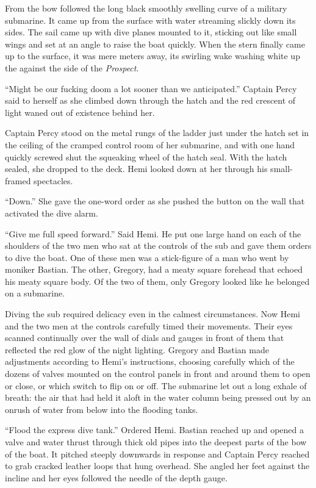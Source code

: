 \documentclass[]{article}
\begin{document}
From the bow followed the long black smoothly swelling curve of a
military submarine. It came up from the surface with water streaming
slickly down its sides. The sail came up with dive planes mounted to it,
sticking out like small wings and set at an angle to raise the boat
quickly. When the stern finally came up to the surface, it was mere
meters away, its swirling wake washing white up the against the side of
the \emph{Prospect}.

``Might be our fucking doom a lot sooner than we anticipated.'' Captain
Percy said to herself as she climbed down through the hatch and the red
crescent of light waned out of existence behind her.

Captain Percy stood on the metal rungs of the ladder just under the
hatch set in the ceiling of the cramped control room of her submarine,
and with one hand quickly screwed shut the squeaking wheel of the hatch
seal. With the hatch sealed, she dropped to the deck. Hemi looked down
at her through his small-framed spectacles.

``Down.'' She gave the one-word order as she pushed the button on the
wall that activated the dive alarm.

``Give me full speed forward.'' Said Hemi. He put one large hand on each
of the shoulders of the two men who sat at the controls of the sub and
gave them orders to dive the boat. One of these men was a stick-figure
of a man who went by moniker Bastian. The other, Gregory, had a meaty
square forehead that echoed his meaty square body. Of the two of them,
only Gregory looked like he belonged on a submarine.

Diving the sub required delicacy even in the calmest circumstances. Now
Hemi and the two men at the controls carefully timed their movements.
Their eyes scanned continually over the wall of dials and gauges in
front of them that reflected the red glow of the night lighting. Gregory
and Bastian made adjustments according to Hemi's instructions, choosing
carefully which of the dozens of valves mounted on the control panels in
front and around them to open or close, or which switch to flip on or
off. The submarine let out a long exhale of breath: the air that had
held it aloft in the water column being pressed out by an onrush of
water from below into the flooding tanks.

``Flood the express dive tank.'' Ordered Hemi. Bastian reached up and
opened a valve and water thrust through thick old pipes into the deepest
parts of the bow of the boat. It pitched steeply downwards in response
and Captain Percy reached to grab cracked leather loops that hung
overhead. She angled her feet against the incline and her eyes followed
the needle of the depth gauge.
\end{document}
